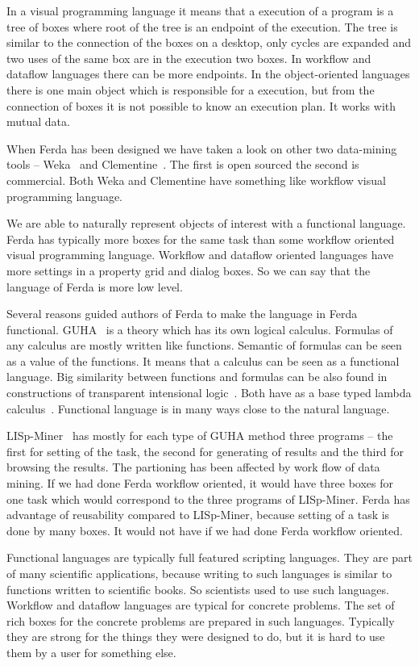 \documentclass[a4paper,12pt]{book}
\begin{document}
In a visual programming language it means that a execution of a program is a tree of boxes where root of the tree is an endpoint of the execution. The tree is similar to the connection of the boxes on a desktop, only cycles are expanded and two uses of the same box are in the execution two boxes. In workflow and dataflow languages there can be more endpoints. In the object-oriented languages there is one main object which is responsible for a execution, but from the connection of boxes it is not possible to know an execution plan. It works with mutual data.

When Ferda has been designed we have taken a look on other two data-mining tools -- Weka~\cite{WebWeka} and Clementine~\cite{WebClementine}. The first is open sourced the second is commercial. Both Weka and Clementine have something like workflow visual programming language.

We are able to naturally represent objects of interest with a functional language. Ferda has typically more boxes for the same task than some workflow oriented visual programming language. Workflow and dataflow oriented languages have more settings in a property grid and dialog boxes. So we can say that the language of Ferda is more low level.

Several reasons guided authors of Ferda to make the language in Ferda functional. GUHA~\cite{GUHAbook} is a theory which has its own logical calculus. Formulas of any calculus are mostly written like functions. Semantic of formulas can be seen as a value of the functions. It means that a calculus can be seen as a functional language. Big similarity between functions and formulas can be also found in constructions of transparent intensional logic~\cite{webTIL}. Both have as a base typed lambda calculus~\cite{WikiLambdaCalculus}. Functional language is in many ways close to the natural language. 

LISp-Miner~\cite{LISp-Miner} has mostly for each type of GUHA method three programs -- the first for setting of the task, the second for generating of results and the third for browsing the results. The partioning has been affected by work flow of data mining. If we had done Ferda workflow oriented, it would have three boxes for one task which would correspond to the three programs of LISp-Miner. Ferda has advantage of reusability compared to LISp-Miner, because setting of a task is done by many boxes. It would not have if we had done Ferda workflow oriented. 

Functional languages are typically full featured scripting languages. They are part of many scientific applications, because writing to such languages is similar to functions written to scientific books. So scientists used to use such languages. Workflow and dataflow languages are typical for concrete problems. The set of rich boxes for the concrete problems are prepared in such languages. Typically they are strong for the things they were designed to do, but it is hard to use them by a user for something else.
\end{document}
